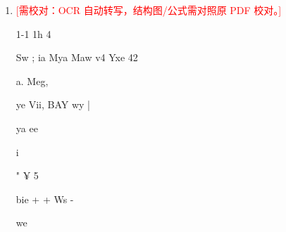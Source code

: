 \documentclass[UTF8,12pt,a4paper,openany]{ctexbook}
\newcommand{\TODO}[1]{\textcolor{red}{[需校对：#1]}}
\begin{document}
\begin{enumerate}[label=\textbf{\arabic*.},leftmargin=2em]
\item \TODO{OCR 自动转写，结构图/公式需对照原 PDF 校对。}\par 1-1 1h 4\par Sw ;     ia Mya Maw v4 Yxe 42\par a. Meg,\par ye Vii, BAY wy         |\par ya ee\par i\par "    ¥     5\par bie + + Ws -\par we
\end{enumerate}
\end{document}
